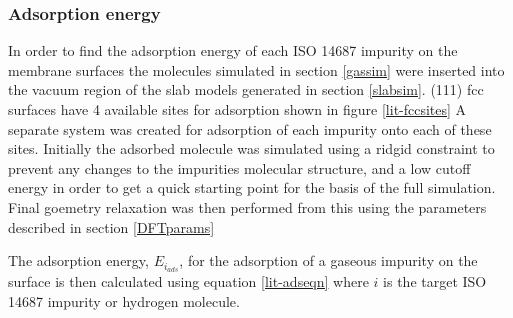\subsubsection{Adsorption energy}
In order to find the adsorption energy of each ISO 14687 impurity on the membrane surfaces the molecules simulated in section \ref{gassim} were inserted into the vacuum region of the slab models generated in section \ref{slabsim}. (111) fcc surfaces have 4 available sites for adsorption shown in figure \ref{lit-fccsites} A separate system was created for adsorption of each impurity onto each of these sites. Initially the adsorbed molecule was simulated using a ridgid constraint to prevent any changes to the impurities molecular structure, and a low cutoff energy in order to get a quick starting point for the basis of the full simulation. Final goemetry relaxation was then performed from this using the parameters described in section \ref{DFTparams}

The adsorption energy, $E_{i_{ads}}$, for the adsorption of a gaseous impurity on the surface is then calculated using equation \ref{lit-adseqn} where $i$ is the target ISO 14687 impurity or hydrogen molecule.

\renewcommand{\bibname}{References}

